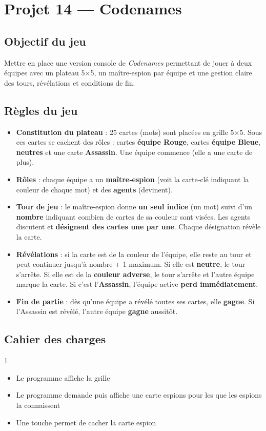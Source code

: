 \section{Projet 14 — Codenames}

\subsection*{Objectif du jeu}
Mettre en place une version console de \textit{Codenames} permettant de jouer à deux équipes avec un plateau 5×5, un maître‑espion par équipe et une gestion claire des tours, révélations et conditions de fin.

\subsection*{Règles du jeu}
\begin{itemize}
  \item \textbf{Constitution du plateau} : 25 cartes (mots) sont placées en grille 5×5. Sous ces cartes se cachent des rôles : cartes \textbf{équipe Rouge}, cartes \textbf{équipe Bleue}, \textbf{neutres} et une carte \textbf{Assassin}. Une équipe commence (elle a une carte de plus).
  \item \textbf{Rôles} : chaque équipe a un \textbf{maître‑espion} (voit la carte‑clé indiquant la couleur de chaque mot) et des \textbf{agents} (devinent).
  \item \textbf{Tour de jeu} : le maître‑espion donne \textbf{un seul indice} (un mot) suivi d’un \textbf{nombre} indiquant combien de cartes de sa couleur sont visées. Les agents discutent et \textbf{désignent des cartes une par une}. Chaque désignation révèle la carte.
  \item \textbf{Révélations} : si la carte est de la couleur de l’équipe, elle reste au tour et peut continuer jusqu’à nombre + 1 maximum. Si elle est \textbf{neutre}, le tour s’arrête. Si elle est de la \textbf{couleur adverse}, le tour s’arrête et l’autre équipe marque la carte. Si c’est l’\textbf{Assassin}, l’équipe active \textbf{perd immédiatement}.
  \item \textbf{Fin de partie} : dès qu’une équipe a révélé toutes ses cartes, elle \textbf{gagne}. Si l’Assassin est révélé, l’autre équipe \textbf{gagne} aussitôt.
\end{itemize}

\subsection*{Cahier des charges}
\begin{UPSTICahierDesCharges}{1}
\begin{itemize}
  \item Le programme affiche la grille
  \item Le programme demande puis affiche une carte espions pour les que les espions la connaissent
  \item Une touche permet de cacher la carte espion
\end{itemize}
\end{UPSTICahierDesCharges}

